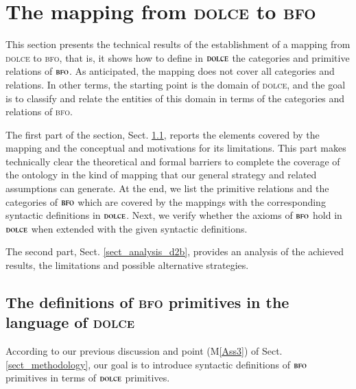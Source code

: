 \documentclass[ao]{iosart2x}
\newcommand{\nb}[1]{\textcolor{red}{$|$}\marginpar{\hspace*{-0cm}\parbox{20mm}{\scriptsize\raggedright\textcolor{red}{#1}}}}
\newcommand{\dolce}{{\textsc{dolce}}}
\newcommand{\bfo}{{\textsc{bfo}}}
\newcommand {\thdolce} {\ensuremath{\mathfrak{D}}}
\begin{document}
\section{The mapping from {\dolce} to {\bfo}}\label{sect_d2b}


This section presents the technical results of the establishment of a mapping from {\dolce} to {\bfo}, that is, it shows how to define in {$\dolce$} the categories and primitive relations of {$\bfo$}. As anticipated, the mapping does not cover all categories and relations. 
In other terms, the starting point is the domain of {\dolce}, and the goal is to classify and relate the entities of this domain in terms of the categories and relations of {\bfo}.%

The first part of the section, Sect. \ref{sect_mappings_d2b}, reports the elements covered by the mapping and the conceptual and motivations for its limitations. This part makes technically clear the theoretical and formal barriers to complete the coverage of the ontology in the kind of mapping that our general strategy and related assumptions can generate. 
At the end, we list the primitive relations and the categories of {$\bfo$} which are covered by the mappings with the corresponding syntactic definitions in {$\dolce$}. 
Next, we verify whether the axioms of {$\bfo$} hold in {$\dolce$} when extended with the given syntactic definitions. 

The second part, Sect. \ref{sect_analysis_d2b}, provides an analysis of the achieved results, the limitations and possible alternative strategies.


\subsection{The definitions of {\bfo} primitives in the language of {\dolce}}\label{sect_mappings_d2b}
According to our previous discussion and point (M\ref{Ass3}) of Sect. \ref{sect_methodology}, our goal is to introduce syntactic definitions of {$\bfo$} primitives in terms of {$\dolce$} primitives.
\end{document}
